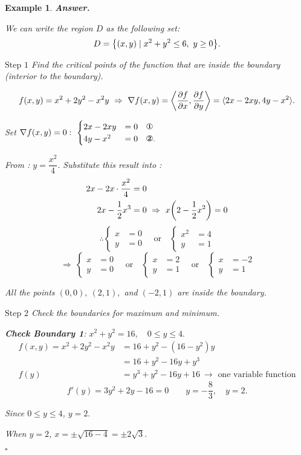 \documentclass[12pt,a4paper]{article}
\newtheorem{eg}{Example}[subsection]
\newenvironment*{ans}{\par\indent\textbf{\textit{Answer. }}\par}{\par\hfill{$\square$}\par}
\begin{document}
\begin{eg}
\begin{ans}
		We can write the region $D$ as the following set: \[D=\qty{(x,y)\mid x^2+y^2\leq6,\ y\geq0}.\]\par$\boxed{\text{Step }1}$ Find the critical points of the function that are inside the boundary (interior to the boundary). \par\hspace{5mm} \[f(x,y)=x^2+2y^2-x^2y\ \Rightarrow\ \nabla f(x,y)=\left\langle\pdv{f}{x},\pdv{f}{y}\right\rangle=\langle2x-2xy, 4y-x^2\rangle.\]\par\hspace{5mm} Set $\nabla f(x,y)=0:\ \begin{cases} 2x-2xy&=0\quad\text{\ding{172}}\\4y-x^2&=0\quad\text{\ding{173}}.\end{cases}$\par\hspace{5mm} From : $y=\dfrac{x^2}{4}.$ Substitute this result into : \[\begin{aligned}2x-2x\cdot\frac{x^2}{4}&=0\\2x-\frac{1}{2}x^3&=0\ \Rightarrow\ x\qty(2-\frac{1}{2}x^2)=0\end{aligned}\]\[\therefore \begin{cases}x&=0\\y&=0\end{cases}\quad\text{or}\quad\begin{cases}x^2&=4\\y&=1\end{cases}\]\[\ \Rightarrow\ \begin{cases}x&=0\\y&=0\end{cases}\quad\text{or}\quad\begin{cases}x&=2\\y&=1\end{cases}\quad\text{or}\quad\begin{cases}x&=-2\\y&=1\end{cases}\]\par\hspace{5mm} All the points $(0,0),\ (2,1),$ and $(-2,1)$ are inside the boundary.\par$\boxed{\text{Step }2}$ Check the boundaries for maximum and minimum. \par\hspace{5mm}\textbf{Check Boundary 1}: $x^2+y^2=16,\quad0\leq y\leq4.$ \[\begin{aligned}f(x,y)=x^2+2y^2-x^2y&=16+y^2-(16-y^2)y\\&=16+y^2-16y+y^3\\f(y)&=y^3+y^2-16y+16\ \rightarrow\text{ one variable function}\end{aligned}\] \[f'(y)=3y^2+2y-16=0\qquad y=-\dfrac{8}{3},\quad y=2.\]\par\hspace{10mm} Since $0\leq y\leq4$, $y=2.$\par\hspace{10mm} When $y=2$, $x=\pm\sqrt{16-4}=\pm2\sqrt{3}.$ 
\end{ans}
\end{eg}
\end{document}
